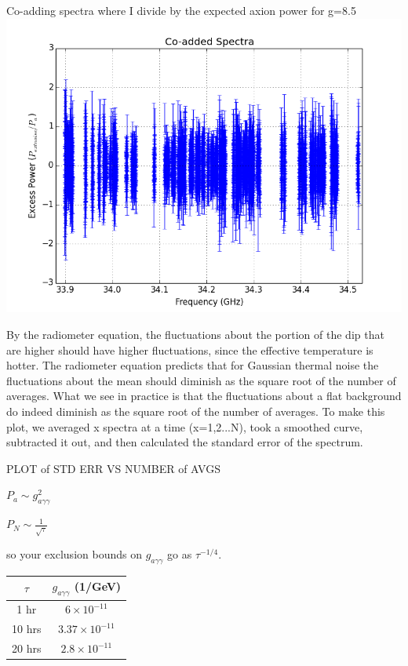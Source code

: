 \documentclass[11pt]{article}
\begin{document}
Co-adding spectra where I divide by the expected axion power for g=8.5
\includegraphics[width=\textwidth]{what}


By the radiometer equation, the fluctuations about the portion of the dip that are higher should have higher fluctuations, since the effective temperature is hotter. The radiometer equation predicts that for Gaussian thermal noise the fluctuations about the mean should diminish as the square root of the number of averages. What we see in practice is that the fluctuations about a flat background do indeed diminish as the square root of the number of averages. To make this plot, we averaged x spectra at a time (x=1,2...N), took a smoothed curve, subtracted it out, and then calculated the standard error of the spectrum.

PLOT of STD ERR VS NUMBER of AVGS

$P_a \sim g_{a\gamma\gamma}^2$

$P_N \sim \frac{1}{\sqrt{\tau}}$

so your exclusion bounds on $g_{a\gamma\gamma}$ go as $\tau^{-1/4}$.


\begin{tabular}{|c | c|}
\hline
$\tau$ & $g_{a\gamma\gamma}$ (1/GeV) \\ \hline
1 hr & $6\times10^{-11}$ \\ \hline
10 hrs & $3.37\times10^{-11}$ \\ \hline
20 hrs & $2.8\times10^{-11}$ \\ \hline
\end{tabular}
\end{document}
